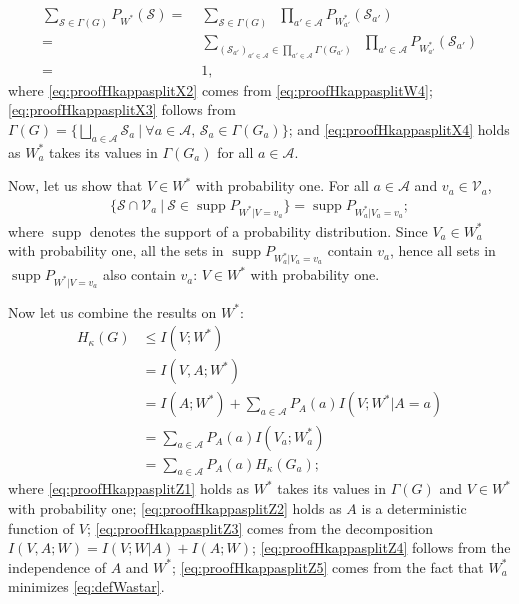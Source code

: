 \documentclass[conference,a4paper]{IEEEtran}
\DeclareMathOperator*{\supp}{supp}
\begin{document}
\begin{align}
    \sum_{\mathcal{S} \in \Gamma(G)} P_{W^*}(\mathcal{S}) = & \; \sum_{\mathcal{S} \in \Gamma(G)} \;\;\prod_{a' \in \mathcal{A}} P_{W^*_{a'}}(\mathcal{S}_{a'}) \label{eq:proofHkappasplitX2}\\
    = & \; \sum_{(\mathcal{S}_{a'})_{a' \in \mathcal{A}} \in \prod_{a' \in \mathcal{A}} \Gamma(G_{a'})} \;\; \prod_{a' \in \mathcal{A}}P_{W^*_{a'}}(\mathcal{S}_{a'}) \label{eq:proofHkappasplitX3}\\
    = & \; 1, \label{eq:proofHkappasplitX4}
\end{align}
where \eqref{eq:proofHkappasplitX2} comes from \eqref{eq:proofHkappasplitW4}; \eqref{eq:proofHkappasplitX3} follows from $\Gamma(G) = \big\lbrace \bigsqcup_{a \in \mathcal{A}} \mathcal{S}_a \:\big|\: \forall a \in \mathcal{A}, \, \mathcal{S}_a \in \Gamma(G_a) \big\rbrace$; and \eqref{eq:proofHkappasplitX4} holds as $W^*_a$ takes its values in $\Gamma(G_a)$ for all $a \in \mathcal{A}$.

Now, let us show that $V \in W^*$ with probability one. For all $a \in \mathcal{A}$ and $v_a \in \mathcal{V}_a$,
\begin{align}
    \lbrace \mathcal{S} \cap \mathcal{V}_a \:|\: \mathcal{S} \in \supp P_{W^*|V = v_a} \rbrace = \supp P_{W^*_a|V_a = v_a};
\end{align}
where $\supp$ denotes the support of a probability distribution. Since $V_a \in W^*_a$ with probability one, all the sets in $\supp P_{W^*_a|V_a = v_a}$ contain $v_a$, hence all sets in $\supp P_{W^*|V = v_a}$ also contain $v_a$: $V \in W^*$ with probability one.

Now let us combine the results on $W^*$:
\begin{align}
    H_\kappa(G) & \leq I(V;W^*) \label{eq:proofHkappasplitZ1}\\
    & = I(V,A;W^*) \label{eq:proofHkappasplitZ2}\\
    & = I(A;W^*) + \sum_{a \in \mathcal{A}} P_A(a) I(V;W^*|A = a)\label{eq:proofHkappasplitZ3}\\
    & = \sum_{a \in \mathcal{A}} P_A(a) I(V_a;W_a^*) \label{eq:proofHkappasplitZ4}\\
    & = \sum_{a \in \mathcal{A}} P_A(a) H_\kappa(G_a); \label{eq:proofHkappasplitZ5}
\end{align}
where \eqref{eq:proofHkappasplitZ1} holds as $W^*$ takes its values in $\Gamma(G)$ and $V \in W^*$ with probability one; \eqref{eq:proofHkappasplitZ2} holds as $A$ is a deterministic function of $V$; \eqref{eq:proofHkappasplitZ3} comes from the decomposition $I(V,A;W) = I(V;W|A) + I(A;W)$; \eqref{eq:proofHkappasplitZ4} follows from the independence of $A$ and $W^*$; \eqref{eq:proofHkappasplitZ5} comes from the fact that $W^*_a$ minimizes \eqref{eq:defWastar}. \newline
\end{document}
